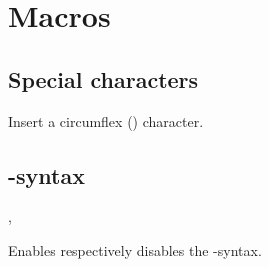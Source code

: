 \documentclass[11pt, cm-default]{l3doc}
\begin{document}
	\newpage
	
	\section{Macros}
	\subsection{Special characters}
	\begin{function}[updated=v1.4.0]{\cir}
		\begin{syntax}
		\end{syntax}
		Insert a circumflex (\cir) character.
	\end{function}



	\subsection{-syntax}
	\begin{function}{\enableeasyformat, \disableeasyformat}
		\begin{syntax}
		\end{syntax}
		Enables respectively disables the -syntax.
	\end{function}
	
\end{document}
